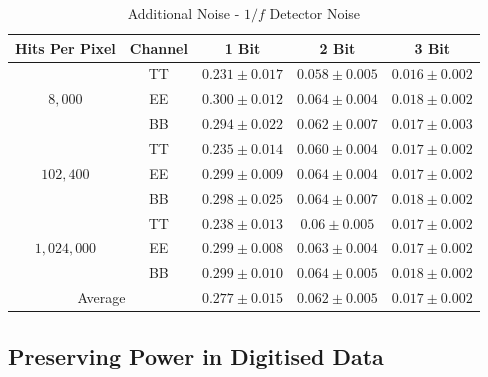 \documentclass[apj]{emulateapj}
\begin{document}
\def\arraystretch{1.3}
\begin{table}[tbh]
\begin{center}
\caption{\label{tab:extranoiseoof} Additional Noise - $1/f$ Detector Noise}
\small
\begin{tabular}{c c c c c}
Hits Per Pixel & Channel & 1 Bit & 2 Bit & 3 Bit \\
\hline
\hline
\multirow{3}{*}{$8,000$}  & TT  & $ 0.231 \pm 0.017 $  & $ 0.058 \pm 0.005 $  & $ 0.016 \pm 0.002 $ \\
& EE  & $ 0.300 \pm 0.012 $  & $ 0.064 \pm 0.004 $  & $ 0.018 \pm 0.002 $ \\
& BB  & $ 0.294 \pm 0.022 $  & $ 0.062 \pm 0.007 $  & $ 0.017 \pm 0.003 $ \\
\hline
\multirow{3}{*}{$102,400$}  & TT  & $ 0.235 \pm 0.014 $  & $ 0.060 \pm 0.004 $  & $ 0.017 \pm 0.002 $ \\
& EE  & $ 0.299 \pm 0.009 $  & $ 0.064 \pm 0.004 $  & $ 0.017 \pm 0.002 $ \\
& BB  & $ 0.298 \pm 0.025 $  & $ 0.064 \pm 0.007 $  & $ 0.018 \pm 0.002 $ \\
\hline
\multirow{3}{*}{$1,024,000$}  & TT  & $ 0.238 \pm 0.013 $  & $ 0.06 \pm 0.005 $  & $ 0.017 \pm 0.002 $ \\
& EE  & $ 0.299 \pm 0.008 $  & $ 0.063 \pm 0.004 $  & $ 0.017 \pm 0.002 $ \\
& BB  & $ 0.299 \pm 0.010 $  & $ 0.064 \pm 0.005 $  & $ 0.018 \pm 0.002 $ \\
\hline
\multicolumn{2}{c}{Average}  & $ 0.277 \pm 0.015 $  & $ 0.062 \pm 0.005 $  & $ 0.017 \pm 0.002 $ \\
\end{tabular}
 \normalsize
\end{center}
\end{table}


\subsection{Preserving Power in Digitised Data}
\label{subsec:appendixpreservepower}
\end{document}
